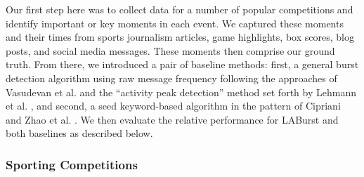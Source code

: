\documentclass[letterpaper]{article}
\begin{document}
Our first step here was to collect data for a number of popular competitions and identify important or key moments in each event.
We captured these moments and their times from sports journalism articles, game highlights, box scores, blog posts, and social media messages.
These moments then comprise our ground truth.
From there, we introduced a pair of baseline methods: first, a general burst detection algorithm using raw message frequency following the approaches of Vasudevan et al. and the ``activity peak detection'' method set forth by Lehmann et al. \cite{vasudevan2013twitter,Lehmann:2012:DCC:2187836.2187871}, and second, a seed keyword-based algorithm in the pattern of Cipriani and Zhao et al. \cite{Cipriani2014,Zhao2011}.
We then evaluate the relative performance for LABurst and both baselines as described below.

\subsubsection{Sporting Competitions}
\end{document}
